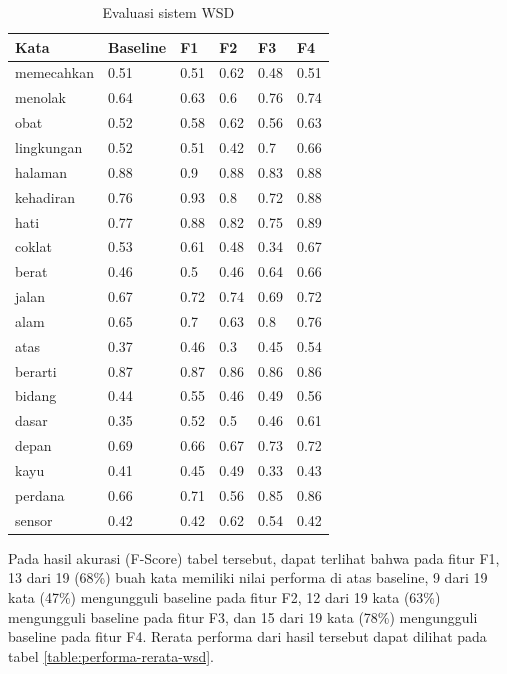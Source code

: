 \begin{table}
	\centering
	\caption{Evaluasi sistem WSD}
	\label{table:wsd-evaluation-crawling}
	\begin{tabular}{|p{3cm}|p{1.5cm}|p{1.5cm}|p{1.5cm}|p{1.5cm}|p{1.5cm}|}
		\hline
		\textbf{Kata} & \textbf{Baseline} & \textbf{F1} & \textbf{F2} & \textbf{F3} & \textbf{F4} \\ \hline
		memecahkan & 0.51 & 0.51 & 0.62 & 0.48 & 0.51 \\ \hline
		menolak & 0.64 & 0.63 & 0.6 & 0.76 & 0.74 \\ \hline
		obat & 0.52 & 0.58 & 0.62 & 0.56 & 0.63 \\ \hline
		lingkungan & 0.52 & 0.51 & 0.42 & 0.7 & 0.66 \\ \hline
		halaman & 0.88 & 0.9 & 0.88 & 0.83 & 0.88 \\ \hline
		kehadiran & 0.76 & 0.93 & 0.8 & 0.72 & 0.88 \\ \hline
		hati & 0.77 & 0.88 & 0.82 & 0.75 & 0.89 \\ \hline
		coklat & 0.53 & 0.61 & 0.48 & 0.34 & 0.67 \\ \hline
		berat & 0.46 & 0.5 & 0.46 & 0.64 & 0.66 \\ \hline
		jalan & 0.67 & 0.72 & 0.74 & 0.69 & 0.72 \\ \hline
		alam & 0.65 & 0.7 & 0.63 & 0.8 & 0.76 \\ \hline
		atas & 0.37 & 0.46 & 0.3 & 0.45 & 0.54 \\ \hline
		berarti & 0.87 & 0.87 & 0.86 & 0.86 & 0.86 \\ \hline
		bidang & 0.44 & 0.55 & 0.46 & 0.49 & 0.56 \\ \hline
		dasar & 0.35 & 0.52 & 0.5 & 0.46 & 0.61 \\ \hline
		depan & 0.69 & 0.66 & 0.67 & 0.73 & 0.72 \\ \hline
		kayu & 0.41 & 0.45 & 0.49 & 0.33 & 0.43 \\ \hline
		perdana & 0.66 & 0.71 & 0.56 & 0.85 & 0.86 \\ \hline
		sensor & 0.42 & 0.42 & 0.62 & 0.54 & 0.42 \\ \hline
	\end{tabular} 
\end{table}


Pada hasil akurasi (F-Score) tabel tersebut, dapat terlihat bahwa pada fitur F1, 13 dari 19 (68\%) buah kata memiliki nilai performa di atas baseline, 9 dari 19 kata (47\%) mengungguli baseline pada fitur F2, 12 dari 19 kata (63\%) mengungguli baseline pada fitur F3, dan 15 dari 19 kata (78\%) mengungguli baseline pada fitur F4. Rerata performa dari hasil tersebut dapat dilihat pada tabel \ref{table:performa-rerata-wsd}.


